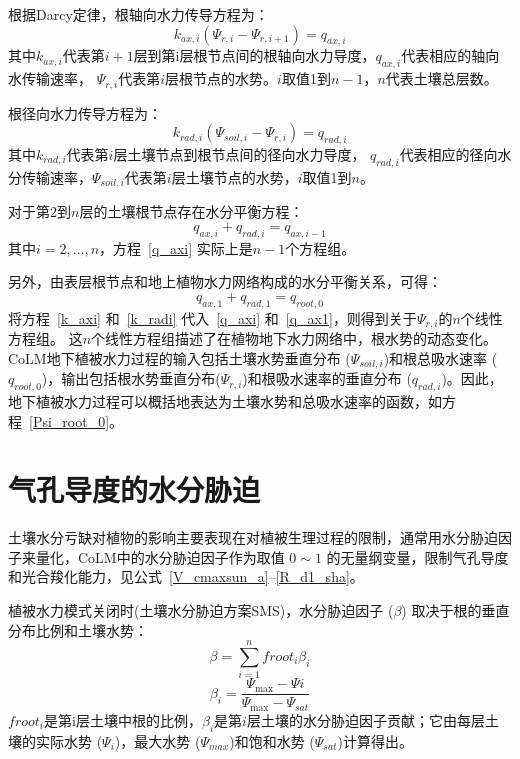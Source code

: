 根据Darcy定律，根轴向水力传导方程为：
\begin{equation}\label{k_axi}
k_{ax,i}\left(\Psi_{r,i}-\Psi_{r,i+1}\right)=q_{ax,i}
\end{equation}
其中$k_{ax,i}$代表第$i+1$层到第i层根节点间的根轴向水力导度，$q_{ax,i}$代表相应的轴向水传输速率，
$\Psi_{r,i}$代表第$i$层根节点的水势。$i$取值1到$n-1$，$n$代表土壤总层数。

根径向水力传导方程为：
\begin{equation}\label{k_radi}
k_{rad,i}\left(\Psi_{soil,i}-\Psi_{r,i}\right)=q_{rad,i}
\end{equation}
其中$k_{rad,i}$代表第$i$层土壤节点到根节点间的径向水力导度，
$q_{rad,i}$代表相应的径向水分传输速率，$\Psi_{soil,i}$代表第$i$层土壤节点的水势，$i$取值1到$n$。



对于第2到$n$层的土壤根节点存在水分平衡方程：
\begin{equation}\label{q_axi}
q_{a x, i}+q_{r a d, i}=q_{a x, i-1}
\end{equation}
其中$i=2, \ldots, n$，方程~\eqref{q_axi} 实际上是$n-1$个方程组。


另外，由表层根节点和地上植物水力网络构成的水分平衡关系，可得：
\begin{equation}\label{q_ax1}
q_{ax,1}+q_{rad, 1}=q_{root,0}
\end{equation}
将方程~\eqref{k_axi} 和~\eqref{k_radi} 代入~\eqref{q_axi} 和~\eqref{q_ax1}，则得到关于$ \Psi_{r,i}$的$n$个线性方程组。
这$n$个线性方程组描述了在植物地下水力网络中，根水势的动态变化。CoLM地下植被水力过程的输入包括土壤水势垂直分布 ($\Psi_{soil,i}$)和根总吸水速率 ($q_{root,0}$)，输出包括根水势垂直分布($\Psi_{r,i}$)和根吸水速率的垂直分布 ($q_{rad,i}$)。因此，地下植被水力过程可以概括地表达为土壤水势和总吸水速率的函数，如方程~\eqref{Psi_root_0}。


\section{气孔导度的水分胁迫}\label{气孔导度的水分胁迫}
土壤水分亏缺对植物的影响主要表现在对植被生理过程的限制，通常用水分胁迫因子来量化，CoLM中的水分胁迫因子作为取值 $0\sim 1$ 的无量纲变量，限制气孔导度和光合羧化能力，见公式~\eqref{V_cmaxsun_a}--\eqref{R_d1_sha}。

植被水力模式关闭时(土壤水分胁迫方案SMS)，水分胁迫因子 ($\beta$) 取决于根的垂直分布比例和土壤水势：
\begin{equation}\label{beta_0}
\beta=\sum_{i=1}^{n} froot_i \beta_{i}
\end{equation}
%
\begin{equation}\label{beta_i}
\beta_{i}=\frac{\Psi_{\max }-\Psi i}{\Psi_{\max }-\Psi_{s a t}}
\end{equation}
$froot_i$是第i层土壤中根的比例，$\beta_i$是第$i$层土壤的水分胁迫因子贡献；它由每层土壤的实际水势 (${\Psi}_i$)，最大水势 (${\Psi}_{max}$)和饱和水势 (${\Psi}_{sat}$)计算得出。

